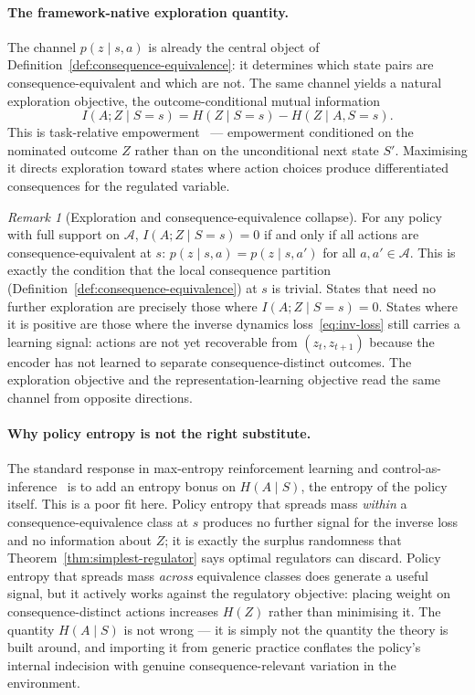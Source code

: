 \documentclass[11pt]{article}
\theoremstyle{remark}
\newtheorem{remark}{Remark}
\newcommand{\Acal}{\mathcal A}
\newcommand{\1}{\mathbb 1}
\begin{document}
\paragraph{The framework-native exploration quantity.}
The channel $p(z\mid s,a)$ is already the central object of Definition~\ref{def:consequence-equivalence}: it determines which state pairs are consequence-equivalent and which are not. The same channel yields a natural exploration objective, the outcome-conditional mutual information
\begin{equation}
    I(A;Z\mid S=s) = H(Z\mid S=s) - H(Z\mid A,S=s).
    \label{eq:exploration-mi}
\end{equation}
This is task-relative empowerment~\citep{Klyubin-empowerment05} --- empowerment conditioned on the nominated outcome $Z$ rather than on the unconditional next state $S'$. Maximising it directs exploration toward states where action choices produce differentiated consequences for the regulated variable.

\begin{remark}[Exploration and consequence-equivalence collapse]
For any policy with full support on $\Acal$, $I(A;Z\mid S=s)=0$ if and only if all actions are consequence-equivalent at $s$: $p(z\mid s,a)=p(z\mid s,a')$ for all $a,a'\in\Acal$. This is exactly the condition that the local consequence partition (Definition~\ref{def:consequence-equivalence}) at $s$ is trivial. States that need no further exploration are precisely those where $I(A;Z\mid S=s)=0$. States where it is positive are those where the inverse dynamics loss~\eqref{eq:inv-loss} still carries a learning signal: actions are not yet recoverable from $(z_t,z_{t+1})$ because the encoder has not learned to separate consequence-distinct outcomes. The exploration objective and the representation-learning objective read the same channel from opposite directions.
\end{remark}

\paragraph{Why policy entropy is not the right substitute.}
The standard response in max-entropy reinforcement learning and control-as-inference~\citep{Levine-reinforcement18} is to add an entropy bonus on $H(A\mid S)$, the entropy of the policy itself. This is a poor fit here. Policy entropy that spreads mass \emph{within} a consequence-equivalence class at $s$ produces no further signal for the inverse loss and no information about $Z$; it is exactly the surplus randomness that Theorem~\ref{thm:simplest-regulator} says optimal regulators can discard. Policy entropy that spreads mass \emph{across} equivalence classes does generate a useful signal, but it actively works against the regulatory objective: placing weight on consequence-distinct actions increases $H(Z)$ rather than minimising it. The quantity $H(A\mid S)$ is not wrong --- it is simply not the quantity the theory is built around, and importing it from generic practice conflates the policy's internal indecision with genuine consequence-relevant variation in the environment.
\end{document}
